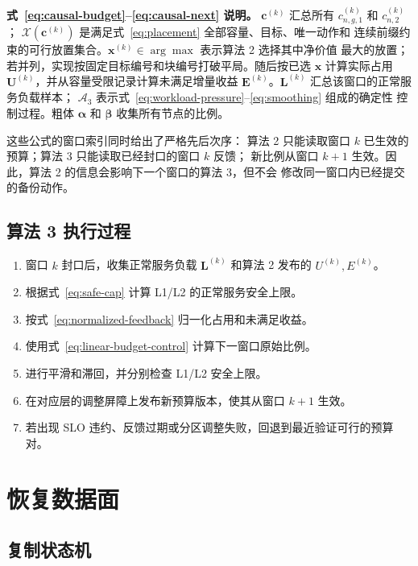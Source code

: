 \documentclass[UTF8,11pt,a4paper,fontset=fandol]{ctexart}
\begin{document}
\noindent\textbf{式~\eqref{eq:causal-budget}--\eqref{eq:causal-next} 说明。}
$\mathbf c^{(k)}$ 汇总所有 $c_{n,g,1}^{(k)}$ 和 $c_{n,2}^{(k)}$；
$\mathcal X(\mathbf c^{(k)})$ 是满足式~\eqref{eq:placement} 全部容量、目标、唯一动作和
连续前缀约束的可行放置集合。$\mathbf x^{(k)}\in\arg\max$ 表示算法 2 选择其中净价值
最大的放置；若并列，实现按固定目标编号和块编号打破平局。随后按已选 $\mathbf x$
计算实际占用 $\mathbf U^{(k)}$，并从容量受限记录计算未满足增量收益
$\mathbf E^{(k)}$。$\mathbf L^{(k)}$ 汇总该窗口的正常服务负载样本；
$\mathcal A_3$ 表示式~\eqref{eq:workload-pressure}--\eqref{eq:smoothing} 组成的确定性
控制过程。粗体 $\boldsymbol\alpha$ 和 $\boldsymbol\beta$ 收集所有节点的比例。

这些公式的窗口索引同时给出了严格先后次序：
算法 2 只能读取窗口 $k$ 已生效的预算；算法 3 只能读取已经封口的窗口 $k$ 反馈；
新比例从窗口 $k+1$ 生效。因此，算法 2 的信息会影响下一个窗口的算法 3，但不会
修改同一窗口内已经提交的备份动作。

\subsection{算法 3 执行过程}

\begin{enumerate}
  \item 窗口 $k$ 封口后，收集正常服务负载
    $\mathbf L^{(k)}$ 和算法 2 发布的 $U^{(k)},E^{(k)}$。
  \item 根据式~\eqref{eq:safe-cap} 计算 L1/L2 的正常服务安全上限。
  \item 按式~\eqref{eq:normalized-feedback} 归一化占用和未满足收益。
  \item 使用式~\eqref{eq:linear-budget-control} 计算下一窗口原始比例。
  \item 进行平滑和滞回，并分别检查 L1/L2 安全上限。
  \item 在对应层的调整屏障上发布新预算版本，使其从窗口 $k+1$ 生效。
  \item 若出现 SLO 违约、反馈过期或分区调整失败，回退到最近验证可行的预算对。
\end{enumerate}

\section{恢复数据面}

\subsection{复制状态机}
\end{document}
